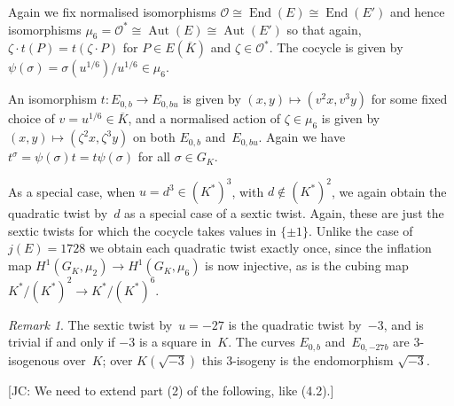 \documentclass[12pt, reqno]{amsart}
\newcommand{\Kbar}{{\overline{K}}}
\newcommand{\calO}{\mathcal{O}}
\DeclareMathOperator{\Aut}{Aut}
\DeclareMathOperator{\End}{End}
\numberwithin{equation}{section}
\theoremstyle{definition}
\theoremstyle{remark}
\newtheorem{remark}[theorem]{Remark}
\newcommand{\jc}[1]{{\color{darkgreen} \textsf{[JC: #1]}}}
\begin{document}
Again we fix normalised isomorphisms $\calO\cong\End(E)\cong\End(E')$
and hence isomorphisms $\mu_6=\calO^*\cong\Aut(E)\cong\Aut(E')$ so
that again, $\zeta\cdot t(P)=t(\zeta\cdot P)$ for $P\in E(\Kbar)$ and
$\zeta\in\calO^*$.  The cocycle is given by $\psi(\sigma) =
\sigma(u^{1/6})/u^{1/6} \in \mu_6$.

An isomorphism $t:E_{0,b}\to E_{0,bu}$ is given by
$(x,y)\mapsto(v^2x,v^3y)$ for some fixed choice of
$v=u^{1/6}\in\Kbar$, and a normalised action of $\zeta\in\mu_6$ is
given by $(x,y)\mapsto(\zeta^2x,\zeta^3y)$ on both $E_{0,b}$
and~$E_{0,bu}$.  Again we have $t^\sigma = \psi(\sigma)t =
t\psi(\sigma)$ for all $\sigma\in G_K$.

As a special case, when $u=d^3\in(K^*)^3$, with $d\notin(K^*)^2$, we
again obtain the quadratic twist by~$d$ as a special case of a sextic
twist.  Again, these are just the sextic twists for which the cocycle
takes values in $\{\pm1\}$.  Unlike the case of $j(E)=1728$ we obtain
each quadratic twist exactly once, since the inflation map
$H^1(G_K,\mu_2)\to H^1(G_K,\mu_6)$ is now injective, as is the cubing
map $K^*/(K^*)^2 \to K^*/(K^*)^6$.

\begin{remark}\label{R:3-isog}
The sextic twist by~$u=-27$ is the quadratic twist by~$-3$, and is
trivial if and only if $-3$ is a square in~$K$.  The curves $E_{0,b}$
and~$E_{0,-27b}$ are $3$-isogenous over~$K$; over $K(\sqrt{-3})$ this
$3$-isogeny is the endomorphism $\sqrt{-3}$.
\end{remark}

\jc{We need to extend part (2) of the following, like (4.2).}
\end{document}
